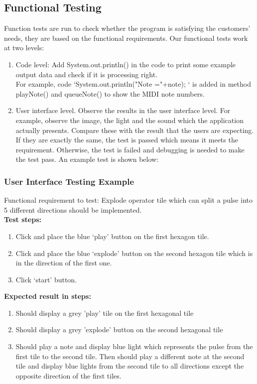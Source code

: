 \documentclass[10pt,a4paper]{article}
\begin{document}
\subsection{Functional Testing}
Function tests are run to check whether the program is satisfying the customers' needs, they are based on the functional requirements. Our functional tests work at two levels:
\begin{enumerate}
\item Code level: Add System.out.println() in the code to print some example output data and check if it is processing right.\\
For example, code ‘System.out.println("Note ="+note); ‘ is added in method playNote() and queueNote() to show the MIDI note numbers.
\item  User interface level. Observe the results in the user interface level. For example, observe the image, the light and the sound which the application actually presents. Compare these with the result that the users are expecting. If they are exactly the same, the test is passed which means it meets the requirement. Otherwise, the test is failed and debugging is needed to make the test pass. An example test is shown below:
\end{enumerate}

\subsubsection{User Interface Testing Example}

Functional requirement to test: Explode operator tile which can split a pulse into 5 different directions should be implemented.\\

\textbf{Test steps:}
\begin{enumerate}
\item Click and place the blue ‘play’ button on the first hexagon tile.

\item Click and place the blue ‘explode’ button on the second hexagon tile which is in the direction of the first one.

\item Click ‘start’ button.
\end{enumerate}

\textbf{Expected result in steps:}
\begin{enumerate}
\item Should display a grey 'play' tile on the first hexagonal tile

\item Should display a grey 'explode' button on the second hexagonal tile

\item Should play a note and display blue light which represents the pulse from the first tile to the second tile. Then should play a different note at the second tile and display blue lights from the second tile to all directions except the opposite direction of the first tiles.
\end{enumerate}
\end{document}
